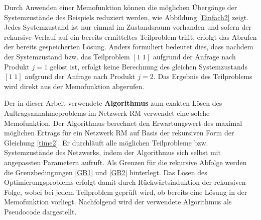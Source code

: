 Durch Anwenden einer Memofunktion können die möglichen Übergänge der Systemzustände des Beispiels reduziert werden, wie Abbildung \ref{Einfach2} zeigt. Jedes Systemzustand ist nur einmal im Zustandsraum vorhanden und sofern der rekursive Verlauf auf ein bereits ermitteltes Teilproblem trifft, erfolgt das Abrufen der bereits gespeicherten Lösung. Anders formuliert bedeutet dies, dass nachdem der Systemzustand bzw. das Teilproblem $[1\; 1]$ aufgrund der Anfrage nach Produkt $j=1$ gelöst ist, erfolgt keine Berechnung des gleichen Systemzustands $[1\; 1]$ aufgrund der Anfrage nach Produkt $j=2$. Das Ergebnis des Teilproblems wird direkt aus der Memofunktion abgerufen.

Der in dieser Arbeit verwendete \textbf{Algorithmus} zum exakten Lösen des Auftragsannahmeproblems im Netzwerk RM verwendet eine solche Memofunktion. Der Algorithmus berechnet den Erwartungswert des maximal möglichen Ertrags für ein Netzwerk RM auf Basis der rekursiven Form der Gleichung \eqref{time2}. Er durchläuft alle möglichen Teilprobleme bzw. Systemzustände des Netzwerks, indem der Algorithmus sich selbst mit angepassten Parametern aufruft. Als Grenzen für die rekursive Abfolge werden die Grenzbedingungen \eqref{GB1} und \eqref{GB2} hinterlegt. Das Lösen des Optimierungsproblems erfolgt damit durch Rückwärtsinduktion der rekursiven Folge, wobei bei jedem Teilproblem geprüft wird, ob bereits eine Lösung in der Memofunktion vorliegt. Nachfolgend wird der verwendete Algorithmus als Pseudocode dargestellt.


